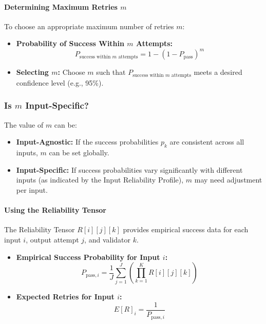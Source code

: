 \documentclass{article}
\begin{document}
\paragraph{Determining Maximum Retries \( m \)}

To choose an appropriate maximum number of retries \( m \):

\begin{itemize}
    \item \textbf{Probability of Success Within \( m \) Attempts:}
    \begin{equation*}
    P_{\text{success within } m \text{ attempts}} = 1 - (1 - P_{\text{pass}})^{m}
    \end{equation*}
    \item \textbf{Selecting \( m \):} Choose \( m \) such that \( P_{\text{success within } m \text{ attempts}} \) meets a desired confidence level (e.g., 95\%).
\end{itemize}

\subsubsection{Is \texorpdfstring{$m$}{m} Input-Specific?}

The value of \( m \) can be:

\begin{itemize}
    \item \textbf{Input-Agnostic:} If the success probabilities \( p_k \) are consistent across all inputs, \( m \) can be set globally.
    \item \textbf{Input-Specific:} If success probabilities vary significantly with different inputs (as indicated by the Input Reliability Profile), \( m \) may need adjustment per input.
\end{itemize}

\paragraph{Using the Reliability Tensor}

The Reliability Tensor \( R[i][j][k] \) provides empirical success data for each input \( i \), output attempt \( j \), and validator \( k \).

\begin{itemize}
    \item \textbf{Empirical Success Probability for Input \( i \):}
    \begin{equation*}
    P_{\text{pass}, i} = \frac{1}{J} \sum_{j=1}^{J} \left( \prod_{k=1}^{K} R[i][j][k] \right)
    \end{equation*}
    \item \textbf{Expected Retries for Input \( i \):}
    \begin{equation*}
    E[R]_i = \frac{1}{P_{\text{pass}, i}}
    \end{equation*}
\end{itemize}
\end{document}
